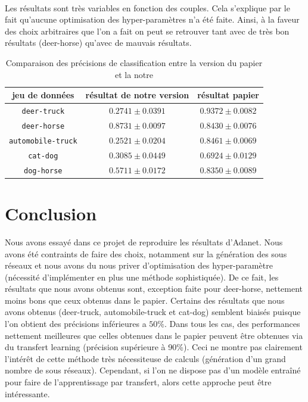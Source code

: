 \documentclass[11 pt]{article}
\begin{document}
\paragraph{} Les résultats sont très variables en fonction des couples. Cela s'explique par le fait qu'aucune optimisation des hyper-paramètres n'a été faite. Ainsi, à la faveur des choix arbitraires que l'on a fait on peut se retrouver tant avec de très bon résultats (deer-horse) qu'avec de mauvais résultats.
\begin{table}[t]
  \centering
    \begin{tabular}{c c c}
      	\toprule
       	 jeu de données &résultat de notre version &résultat papier \\
        \midrule
      	\texttt{deer-truck} & $\mathbf{0.2741\pm0.0391}$ & $0.9372 \pm 0.0082$ \\
      	\texttt{deer-horse} & $\mathbf{0.8731 \pm0.0097}$ & $0.8430 \pm 0.0076$ \\
      	\texttt{automobile-truck} & $\mathbf{0.2521 \pm0.0204}$ & $0.8461 \pm 0.0069$\\
        \texttt{cat-dog} & $\mathbf{ 0.3085\pm0.0449}$ & $0.6924 \pm 0.0129$\\
        \texttt{dog-horse} & $\mathbf{0.5711 \pm0.0172}$ & $0.8350 \pm 0.0089$\\
      	\bottomrule
    \end{tabular}
    \caption{Comparaison des précisions de classification entre la version du papier et la notre}
    \label{table:res}
\end{table}


\section{Conclusion}
Nous avons essayé dans ce projet de reproduire les résultats d'Adanet. Nous avons été contraints de faire des choix, notamment sur la génération des sous réseaux et nous avons du nous priver d'optimisation des hyper-paramètre (nécessité d'implémenter en plus une méthode sophistiquée). De ce fait, les résultats que nous avons obtenus sont, exception faite pour deer-horse, nettement moins bons que ceux obtenus dans le papier. Certains des résultats que nous avons obtenus (deer-truck, automobile-truck et cat-dog) semblent biais\'es puisque l’on obtient des précisions inférieures a $50\%$.
Dans tous les cas, des performances nettement meilleures que celles obtenues dans le papier peuvent être obtenues via du transfert learning (précision supérieure à 90\%). Ceci ne montre pas clairement l'intérêt de cette méthode très nécessiteuse de calculs (génération d'un grand nombre de sous réseaux). Cependant, si l'on ne dispose pas d'un modèle entraîné pour faire de l'apprentissage par transfert, alors cette approche peut être intéressante.
\end{document}
